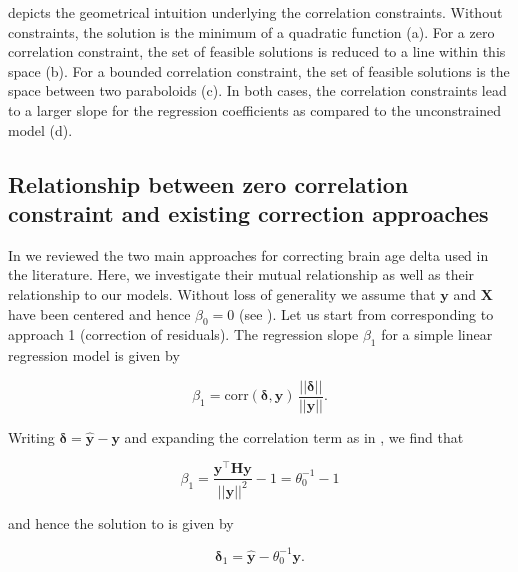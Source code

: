 \documentclass[utf8]{frontiersSCNS} %
\renewcommand{\a}{\theta}
\newcommand{\az}{\a_0}
\newcommand{\corr}{\text{corr}}
\renewcommand{\d}{\boldsymbol{\delta}}
\renewcommand{\H}{\mathbf{H}}
\newcommand{\X}{\mathbf{X}}
\newcommand{\y}{\mathbf{y}}
\newcommand{\yh}{\mathbf{\hat{y}}}
\begin{document}
 depicts the geometrical intuition underlying the correlation constraints. Without constraints, the solution is the minimum of a quadratic function (a). For a zero correlation constraint, the set of feasible solutions is reduced to a line within this space (b). For a bounded correlation constraint, the set of feasible solutions is the space between two paraboloids (c). In both cases, the correlation constraints lead to a larger slope for the regression coefficients as compared to the unconstrained model (d). 


\subsection{Relationship between zero correlation constraint and existing correction approaches}\label{sec:relationship}


In  we reviewed the two main approaches for correcting brain age delta used in the literature. Here, we investigate their mutual relationship as well as their relationship to our models. Without loss of generality we assume that $\y$ and $\X$ have been centered and hence $\beta_0=0$ (see ).
Let us start from  corresponding to approach 1 (correction of residuals). The regression slope $\beta_1$ for a simple linear regression model is given by

\[
\beta_1 = \corr(\d, \y)\,\frac{||\d||}{||\y||}.
\]

Writing $\d = \yh - \y$ and expanding the correlation term as in , we find that

\[
\beta_1 = \frac{\y^\top\H\y}{||\y||^2} - 1 =  \az^{-1} - 1
\]

and hence the solution to  is given by 

\begin{equation}\label{eq:approach1_solution2_d}
     \d_1 = \yh - \az^{-1}\y.
\end{equation}
\end{document}
